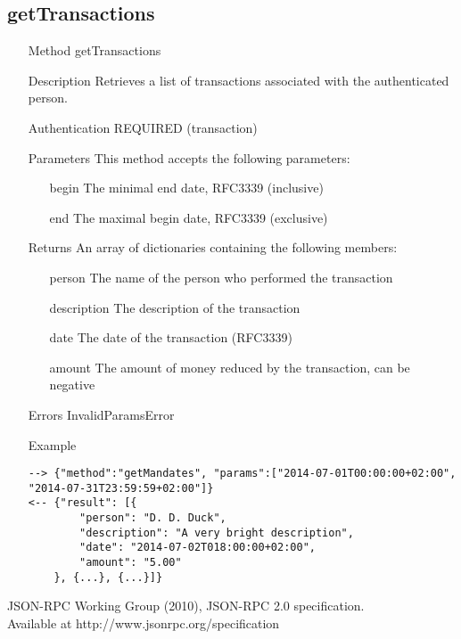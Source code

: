 \documentclass[a4paper]{scrreprt}
\begin{document}
\subsection{getTransactions}
\begin{enumerate}
\item[Method] getTransactions
\item[Description] Retrieves a list of transactions associated with the authenticated person.
\item[Authentication] REQUIRED (transaction)
\item[Parameters] This method accepts the following parameters:
\begin{enumerate}
	\item[begin] The minimal end date, RFC3339 (inclusive)
    \item[end] The maximal begin date, RFC3339 (exclusive)
    \end{enumerate}
\item[Returns] An array of dictionaries containing the following members:
\begin{enumerate}
    \item[person] The name of the person who performed the transaction
    \item[description] The description of the transaction
    \item[date] The date of the transaction (RFC3339)
    \item[amount] The amount of money reduced by the transaction, can be negative
	\end{enumerate}
\item[Errors] InvalidParamsError
\item[Example]
\begin{lstlisting}
--> {"method":"getMandates", "params":["2014-07-01T00:00:00+02:00", "2014-07-31T23:59:59+02:00"]}
<-- {"result": [{
        "person": "D. D. Duck",
        "description": "A very bright description",
        "date": "2014-07-02T018:00:00+02:00",
        "amount": "5.00"
    }, {...}, {...}]}
\end{lstlisting}
\end{enumerate}


\begin{thebibliography}{9}

	JSON-RPC Working Group (2010), JSON-RPC 2.0 specification.\\ Available at http://www.jsonrpc.org/specification

\end{thebibliography}
\end{document}
